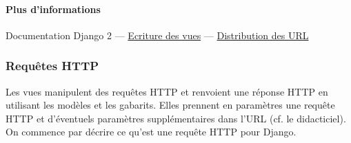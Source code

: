 \documentclass[a4paper, 10pt]{article}
\begin{document}
\paragraph{Plus d'informations} Documentation Django 2 --- \href{https://docs.djangoproject.com/fr/2.0/topics/http/views/}{Ecriture des vues} ---  \href{https://docs.djangoproject.com/fr/2.0/topics/http/urls/}{Distribution des URL}

\subsubsection{Requêtes HTTP}
Les  vues manipulent des requêtes HTTP et renvoient une réponse HTTP en utilisant les modèles et les gabarits. Elles prennent en paramètres une requête HTTP et d'éventuels paramètres supplémentaires dans l'URL (cf. le didacticiel). On commence par décrire ce qu'est une requête HTTP pour Django.
\end{document}
